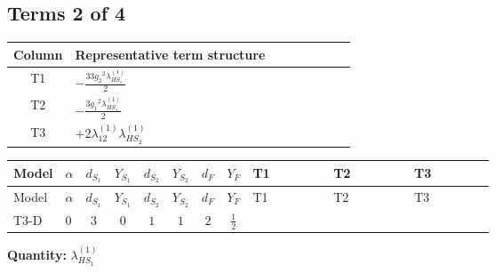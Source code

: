 \documentclass[8pt]{article}
\begin{document}
\begin{landscape}
\subsection*{Terms 2 of 4}
\begin{center}
\begin{tabular}{@{}c >{\raggedright\arraybackslash}p{0.82\linewidth}@{}}
\toprule
Column & Representative term structure \\
\midrule
T1 & \(\displaystyle -\frac{33 {g_2}^2 {\lambda_{HS_1}^{(1)}}}{2}\) \\
\midrule
T2 & \(\displaystyle -\frac{3 {g_1}^2 {\lambda_{HS_1}^{(1)}}}{2}\) \\
\midrule
T3 & \(\displaystyle +2 {\lambda_{12}^{(1)}} {\lambda_{HS_2}^{(1)}}\) \\
\midrule
\bottomrule
\end{tabular}
\end{center}
\smallskip
\tiny
\begin{longtable}{@{}llcccccc >{\raggedright\arraybackslash}p{0.21\linewidth} >{\raggedright\arraybackslash}p{0.21\linewidth} >{\raggedright\arraybackslash}p{0.21\linewidth}@{}}
\toprule
Model & $\alpha$ & $d_{S_1}$ & $Y_{S_1}$ & $d_{S_2}$ & $Y_{S_2}$ & $d_F$ & $Y_F$ & T1 & T2 & T3 \\
\midrule
\endfirsthead
\toprule
Model & $\alpha$ & $d_{S_1}$ & $Y_{S_1}$ & $d_{S_2}$ & $Y_{S_2}$ & $d_F$ & $Y_F$ & T1 & T2 & T3 \\
\midrule
\endhead
T3-D & $0$ & $3$ & $0$ & $1$ & $1$ & $2$ & $\frac{1}{2}$ & \scriptsize\adjustbox{max width=\linewidth}{$\begin{gathered} -\frac{33 {g_2}^2 {\lambda_{HS_1}^{(1)}}}{2}\end{gathered}$} & \scriptsize\adjustbox{max width=\linewidth}{$\begin{gathered} -\frac{3 {g_1}^2 {\lambda_{HS_1}^{(1)}}}{2}\end{gathered}$} & \scriptsize\adjustbox{max width=\linewidth}{$\begin{gathered} +2 {\lambda_{12}^{(1)}} {\lambda_{HS_2}^{(1)}}\end{gathered}$} \\
\midrule
\bottomrule
\end{longtable}
\clearpage
\noindent\textbf{Quantity: }$\lambda_{HS_1}^{(1)}$\par\smallskip

\end{landscape}
\end{document}
